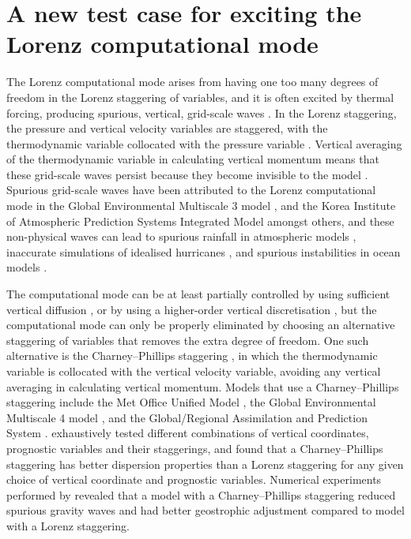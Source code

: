 \chapter{A new test case for exciting the Lorenz computational mode}
\label{ch:cp}

The Lorenz computational mode arises from having one too many degrees of freedom in the Lorenz staggering of variables, and it is often excited by thermal forcing, producing spurious, vertical, grid-scale waves \citep{schneider1987,arakawa-konor1996}.
In the Lorenz staggering, the pressure and vertical velocity variables are staggered, with the thermodynamic variable collocated with the pressure variable \citep{lorenz1960}.
Vertical averaging of the thermodynamic variable in calculating vertical momentum means that these grid-scale waves persist because they become invisible to the model \citep{arakawa-konor1996}.
Spurious grid-scale waves have been attributed to the Lorenz computational mode in the Global Environmental Multiscale 3 model \citep{girard2014}, and the Korea Institute of Atmospheric Prediction Systems Integrated Model \citep{yi-park2017} amongst others, and these non-physical waves can lead to spurious rainfall in atmospheric models \citep{hollingsworth1995}, inaccurate simulations of idealised hurricanes \citep{zhu-smith2003}, and spurious instabilities in ocean models \citep{bell-white2017}.

The computational mode can be at least partially controlled by using sufficient vertical diffusion \citep{chang1992,zadra2004}, or by using a higher-order vertical discretisation \citep{untch-hortal2004,guerra-ullrich2016,yi-park2017}, but the computational mode can only be properly eliminated by choosing an alternative staggering of variables that removes the extra degree of freedom.
One such alternative is the Charney--Phillips staggering \citep{charney-phillips1953}, in which the thermodynamic variable is collocated with the vertical velocity variable, avoiding any vertical averaging in calculating vertical momentum.
Models that use a Charney--Phillips staggering include the Met Office Unified Model \citep{davies2005}, the Global Environmental Multiscale 4 model \citep{girard2014}, and the Global/Regional Assimilation and Prediction System \citep{yang2007}.
\citet{thuburn-woolings2005} exhaustively tested different combinations of vertical coordinates, prognostic variables and their staggerings, and found that a Charney--Phillips staggering has better dispersion properties than a Lorenz staggering for any given choice of vertical coordinate and prognostic variables.
Numerical experiments performed by \citet{cullen1997} revealed that a model with a Charney--Phillips staggering reduced spurious gravity waves and had better geostrophic adjustment compared to  model with a Lorenz staggering.

